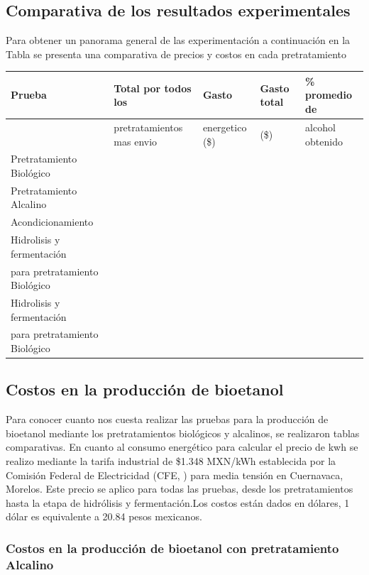 \documentclass[12pt]{article}
\begin{document}
 	
			\subsection{Comparativa de los resultados experimentales}
			
			Para obtener un panorama general de las experimentación a continuación en la Tabla se presenta una comparativa de precios y costos en cada pretratamiento
		
		
	\begin{table}[H]
		\centering
		\resizebox{16cm}{!} {
		\begin{tabular}{|l|l|l|l|l|}
			\hline
			Prueba & Total por todos los  & Gasto  & Gasto total & \% promedio de  \\ \hline
			~ &  pretratamientos mas envio &  energetico (\$) &   (\$) &  alcohol obtenido  \\ \hline
			Pretratamiento Biológico & ~ & ~ & ~ &   \\ \hline
			Pretratamiento Alcalino & ~ & ~ & ~ &   \\ \hline
			Acondicionamiento & ~ & ~ & ~ &   \\ \hline
			Hidrolisis y fermentación  & ~ & ~ & ~ &   \\ \hline
			para pretratamiento Biológico & ~ & ~ & ~ &   \\ \hline
			Hidrolisis y fermentación  & ~ & ~ & ~ &   \\ \hline
			para pretratamiento Biológico & ~ & ~ & ~ &   \\ \hline
		\end{tabular}
	}
	\end{table}
			
			\subsection{Costos en la producción de bioetanol}
	Para conocer cuanto nos cuesta realizar las pruebas para la producción de bioetanol mediante los pretratamientos biológicos y alcalinos, se realizaron tablas comparativas.
	En cuanto al consumo energético para calcular el precio de kwh se realizo mediante la tarifa industrial de \$1.348 MXN/kWh establecida por la Comisión Federal de Electricidad (CFE, \cite{CFE2023}) para media tensión en Cuernavaca, Morelos. Este precio se aplico para todas las pruebas, desde los pretratamientos hasta la etapa de hidrólisis y fermentación.Los costos están dados en dólares, 1 dólar es equivalente a 20.84 pesos mexicanos.
			
			\subsubsection{Costos en la producción de bioetanol con pretratamiento Alcalino}
			
\end{document}

